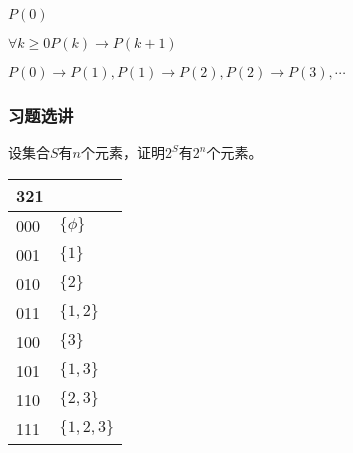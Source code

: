\documentclass{beamer}
\begin{document}
\begin{CJK*}{UTF8}{gbsn}
\begin{frame}
 $P(0)$

 $\forall k\geq 0 P(k) \to P(k+1)$

 $P(0)\to P(1), P(1)\to P(2), P(2)\to P(3), \cdots$
 
\end{frame}


\begin{frame}
  \frametitle{习题选讲}
  \begin{Exercise11}
    设集合$S$有$n$个元素，证明$2^S$有$2^n$个元素。
  \end{Exercise11}

  \begin{tabular}{l|l}
    321&\\
    \hline
    000&$\{\phi\}$\\
    001&$\{1\}$\\
    010&$\{2\}$\\
    011&$\{1,2\}$\\
    100&$\{3\}$\\
    101&$\{1,3\}$\\
    110&$\{2,3\}$\\
    111&$\{1,2,3\}$
  \end{tabular}
\end{frame}


  
\end{CJK*}
\end{document}
